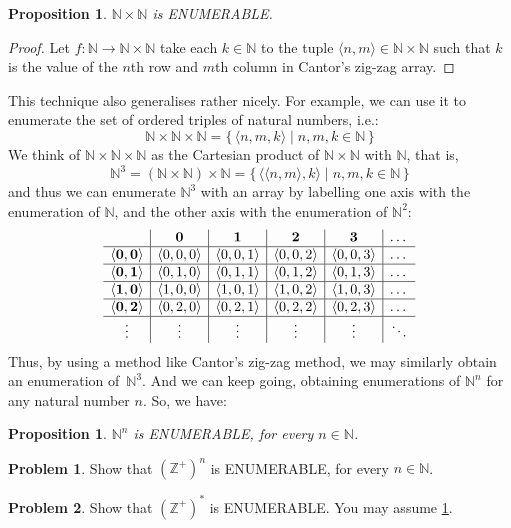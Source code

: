 \documentclass[10pt,a4paper]{article}
\newcommand*{\olup}[1]{\MakeUppercase{#1}}
\theoremstyle{plain}
\newtheorem{prop}[thm]{Proposition}
\theoremstyle{definition}
\newtheorem{prob}{Problem}[section]
\theoremstyle{remark}
\newenvironment{explain}{}{}
\newcommand*{\ollabel}[1]{\label{#1}}
\providecommand{\tuple}[1]{\langle #1 \rangle}
\providecommand{\Nat}{\ensuremath{\mathbb{N}}}
\providecommand{\PosInt}{\mathbb{Z}^{+}}
\providecommand{\Setabs}[2]{\{\, #1 \mid #2 \,\}}
\providecommand{\cref}[1]{\ref{#1}}
\begin{document}
\begin{prop}\ollabel{natsquaredenumerable}
$\Nat \times \Nat$ is \olup{enumerable}.
\end{prop}

\begin{proof}
Let $f \colon \Nat \to \Nat\times\Nat$ take each $k \in \Nat$ to the
tuple $\tuple{n,m} \in \Nat \times \Nat$ such that $k$ is the value of
the $n$th row and $m$th column in Cantor's zig-zag array. 
\end{proof}

\begin{explain}
This technique also generalises rather nicely. For example, we can use
it to enumerate the set of ordered triples of natural numbers, i.e.:
\[
\Nat \times \Nat \times \Nat = \Setabs{\tuple{n,m,k}}{n,m,k \in \Nat}
\]
We think of $\Nat \times \Nat \times \Nat$ as the Cartesian
product of $\Nat \times \Nat$ with $\Nat$, that is,
\[
\Nat^3 = (\Nat \times \Nat) \times \Nat =
\Setabs{\tuple{\tuple{n,m},k}}{n, m, k
  \in \Nat }
\]
and thus we can enumerate $\Nat^3$ with an array by labelling one
axis with the enumeration of $\Nat$, and the other axis with the
enumeration of $\Nat^2$:
\[
\begin{array}{ c | c | c | c | c | c}
& \mathbf 0 & \mathbf 1 & \mathbf 2 & \mathbf 3 & \dots \\
\hline
\mathbf{\tuple{0,0}} & \tuple{0,0,0} & \tuple{0,0,1} & \tuple{0,0,2} & \tuple{0,0,3} & \dots \\
\hline
\mathbf{\tuple{0,1}} & \tuple{0,1,0} & \tuple{0,1,1} & \tuple{0,1,2} & \tuple{0,1,3} & \dots \\
\hline
\mathbf{\tuple{1,0}} & \tuple{1,0,0} & \tuple{1,0,1} & \tuple{1,0,2} & \tuple{1,0,3} & \dots \\
\hline
\mathbf{\tuple{0,2}} & \tuple{0,2,0} & \tuple{0,2,1} & \tuple{0,2,2} & \tuple{0,2,3} & \dots\\
\hline
\vdots & \vdots & \vdots & \vdots & \vdots & \ddots \\
\end{array}
\]
Thus, by using a method like Cantor's zig-zag method, we may similarly
obtain an enumeration of~$\Nat^3$. And we can keep going, obtaining
enumerations of $\Nat^n$ for any natural number $n$. So, we have:
\end{explain}

\begin{prop}
$\Nat^n$ is \olup{enumerable}, for every $n \in \Nat$.
\end{prop}

\begin{prob}\label{sfr:siz:zigzag:prob:posint-n}
Show that $(\PosInt)^n$ is \olup{enumerable}, for every $n \in \Nat$.
\end{prob}

\begin{prob}\label{sfr:siz:zigzag:prob:posint-star}
  Show that $(\PosInt)^*$ is \olup{enumerable}. You may assume \cref{sfr:siz:zigzag:prob:posint-n}.
\end{prob}
\end{document}
